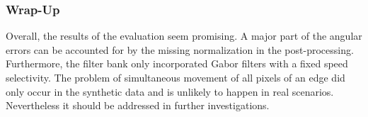 \subsubsection{Wrap-Up}
Overall, the results of the evaluation seem promising.
A major part of the angular errors can be accounted for by the missing normalization in the post-processing.
Furthermore, the filter bank only incorporated Gabor filters with a fixed speed selectivity.
The problem of simultaneous movement of all pixels of an edge did only occur in the synthetic data and is unlikely to happen in real scenarios.
Nevertheless it should be addressed in further investigations.
